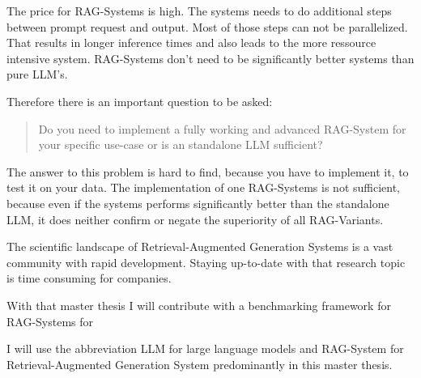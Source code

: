 The price for RAG-Systems is high. The systems needs to do additional steps between prompt request and output. Most of those steps can not be parallelized. That results in longer inference times and also leads to the more ressource intensive system. RAG-Systems don't need to be significantly better systems than pure LLM's.\citet{PLACEHOLDER}

Therefore there is an important question to be asked: 
\begin{quotation}
    Do you need to implement a fully working and advanced RAG-System for your specific use-case or is an standalone LLM sufficient?
\end{quotation}
The answer to this problem is hard to find, because you have to implement it, to test it on your data. The implementation of one RAG-Systems is not sufficient, because even if the systems performs significantly better than the standalone LLM, it does neither confirm or negate the superiority of all RAG-Variants. 

The scientific landscape of Retrieval-Augmented Generation Systems is a vast community with rapid development. Staying up-to-date with that research topic is time consuming for companies.

With that master thesis I will contribute with a benchmarking framework for RAG-Systems for 



I will use the abbreviation LLM for large language models and RAG-System for Retrieval-Augmented Generation System predominantly in this master thesis.
